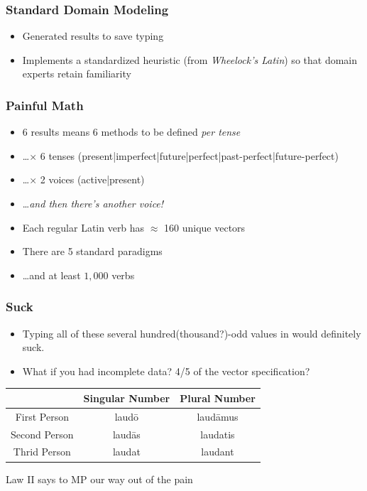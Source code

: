 \documentclass[slidestop,compress,mathserif]{beamer}
\begin{document}
\begin{frame}
	\frametitle{Standard Domain Modeling}
	\begin{itemize}
		\item Generated results to save typing
		\item Implements a standardized heuristic (from \emph{Wheelock's Latin}) so that domain experts retain familiarity
	\end{itemize}
\end{frame}



\begin{frame}
	\frametitle{Painful Math}
	\begin{itemize}
		\item 6 results means 6 methods to be defined \emph{per tense}
		\pause
		\item \ldots $\times$ 6 tenses (present|imperfect|future|perfect|past-perfect|future-perfect)
		\pause
		\item \ldots $\times$ 2 voices (active|present)
		\pause
		\item \ldots \emph{and then there's another voice!}
		\pause
		\item Each regular Latin verb has $\approx$  160 unique vectors
		\pause
		\item There are 5 standard paradigms
		\pause
		\item \ldots and at least $1,000$ verbs
	\end{itemize}
\end{frame}

\begin{frame}
		\frametitle{Suck}
		\begin{itemize}
			\item Typing all of these several hundred(thousand?)-odd values in would definitely suck.
			\pause
			\item What if you had incomplete data?  4/5 of the vector specification?
		\end{itemize}
		\begin{center}
			\begin{tabular}{|c|c|c|}
				\hline
				  & Singular Number &  Plural Number\\
				\hline
				First Person  & laud\={o}  & laud\={a}mus\\
				Second Person & laud\={a}s & laudatis \\
				Thrid Person  & laudat     & laudant \\
				\hline
			\end{tabular}
		\end{center}
		\pause
		Law II says to MP our way out of the pain
\end{frame}
\end{document}
